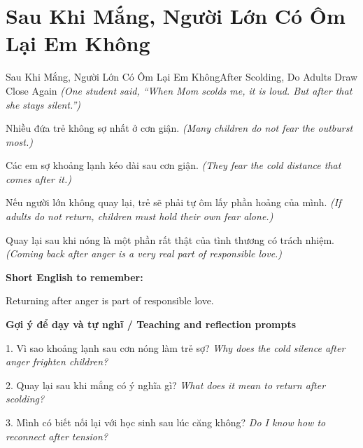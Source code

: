 \section{Sau Khi Mắng, Người Lớn Có Ôm Lại Em Không}
\begin{truyen}{Sau Khi Mắng, Người Lớn Có Ôm Lại Em Không}{After Scolding, Do Adults Draw Close Again}
\textit{(One student said, “When Mom scolds me, it is loud. But after that she stays silent.”)}

Nhiều đứa trẻ không sợ nhất ở cơn giận.
\textit{(Many children do not fear the outburst most.)}

Các em sợ khoảng lạnh kéo dài sau cơn giận.
\textit{(They fear the cold distance that comes after it.)}

Nếu người lớn không quay lại, trẻ sẽ phải tự ôm lấy phần hoảng của mình.
\textit{(If adults do not return, children must hold their own fear alone.)}

\end{truyen}

\begin{baihoc}
Quay lại sau khi nóng là một phần rất thật của tình thương có trách nhiệm.
\textit{(Coming back after anger is a very real part of responsible love.)}
\end{baihoc}

\begin{ghinhoanh}
\textbf{Short English to remember:}

Returning after anger is part of responsible love.

\end{ghinhoanh}

\begin{tuhocnhanh}
\textbf{Gợi ý để dạy và tự nghĩ / Teaching and reflection prompts}

1. Vì sao khoảng lạnh sau cơn nóng làm trẻ sợ? \textit{Why does the cold silence after anger frighten children?}

2. Quay lại sau khi mắng có ý nghĩa gì? \textit{What does it mean to return after scolding?}

3. Mình có biết nối lại với học sinh sau lúc căng không? \textit{Do I know how to reconnect after tension?}
\end{tuhocnhanh}
\ngancach

